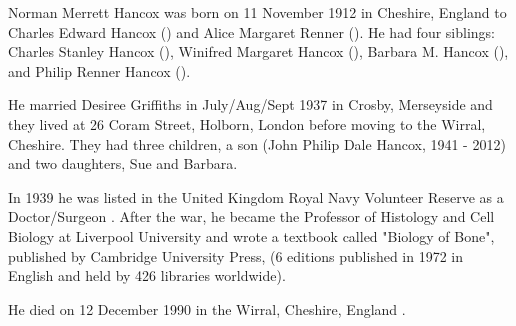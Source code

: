 
Norman Merrett Hancox was born on 11 November 1912 in Cheshire, England to Charles Edward Hancox () and Alice Margaret Renner (). He had four siblings:  Charles Stanley Hancox (),  Winifred Margaret Hancox (), Barbara M. Hancox (), and Philip Renner Hancox ().

He married Desiree Griffiths in July/Aug/Sept 1937 in Crosby, Merseyside \cite{NMHancoxMarriage} and they lived at 26 Coram Street, Holborn, London \cite{NMHancoxResidence} before moving to the Wirral, Cheshire. They had three children, a son (John Philip Dale Hancox, 1941 - 2012) and two daughters, Sue and Barbara.

In 1939 he was listed in the United Kingdom Royal Navy Volunteer Reserve as a  Doctor/Surgeon \cite{NMHancoxWar}.  After the war, he became the Professor of Histology and Cell Biology at Liverpool University and wrote a textbook called "Biology of Bone", published by Cambridge University Press, (6 editions published in 1972 in English and held by 426 libraries worldwide)\cite{NMHancoxBook}.

He died on 12 December 1990 in the	Wirral, Cheshire, England \cite{NMHancoxDeath}.

